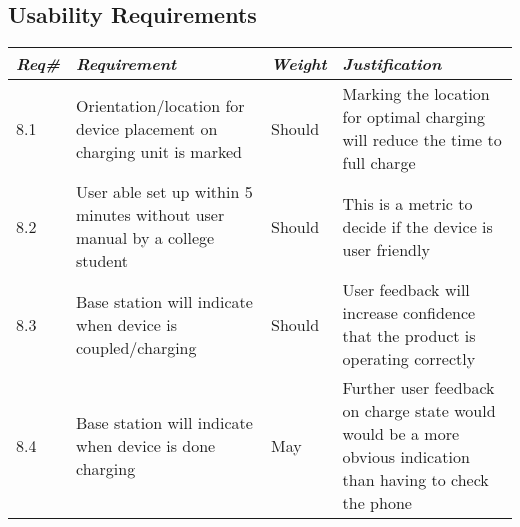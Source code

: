     \subsection{Usability Requirements}
        \begin{centering}
        \begin{tabular}{|l|m{7cm}|l|m{7cm}|}        \hline
        \textit{\textbf{Req\#}}	& \textit{\textbf{Requirement}} &\textit{\textbf{Weight}}&\textit{\textbf{Justification}} \\ \hline
        8.1 & Orientation/location for device placement on charging unit is marked & Should & Marking the location for optimal charging will reduce the time to full charge\\ \hline
        8.2 & User able set up within 5 minutes without user manual by a college student & Should & This is a metric to decide if the device is user friendly \\ \hline
        8.3 & Base station will indicate when device is coupled/charging & Should & User feedback will increase confidence that the product is operating correctly                                \\ \hline
        8.4 & Base station will indicate when device is done charging & May& Further user feedback on charge state would would be a more obvious indication than having to check the phone \\ \hline
        \end{tabular}
        \end{centering}

\newpage